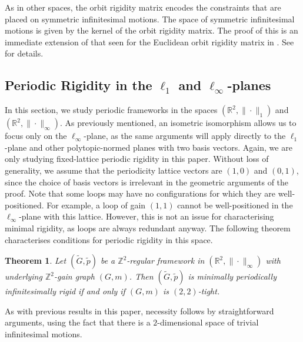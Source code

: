 \documentclass[reqno,a4paper,10pt]{article}
\newtheorem{theorem}{Theorem}[section]
\theoremstyle{definition}
\theoremstyle{remark}
\numberwithin{equation}{section}
\numberwithin{figure}{section}
\numberwithin{table}{section}
\newcommand{\R}{\mathbb{R}}
\newcommand{\Z}{\mathbb{Z}}
\newcommand{\G}{\tilde{G}}
\newcommand{\p}{\tilde{p}}
\begin{document}
    As in other spaces, the orbit rigidity matrix encodes the constraints that are placed on symmetric infinitesimal motions. The space of symmetric infinitesimal motions is given by the kernel of the orbit rigidity matrix. The proof of this is an immediate extension of that seen for the Euclidean orbit rigidity matrix in \cite{Orbit}. See \cite{EssonThesis} for details.
    

    \subsection{Periodic Rigidity in the $\ell_1$ and $\ell_\infty$-planes}\label{SectionPolytopicPeriodic}
    In this section, we study periodic frameworks in the spaces $(\R^2,\|\cdot\|_1)$ and $(\R^2,\|\cdot\|_\infty)$. As previously mentioned, an isometric isomorphism allows us to focus only on the $\ell_\infty$-plane, as the same arguments will apply directly to the $\ell_1$-plane and other polytopic-normed planes with two basis vectors. Again, we are only studying fixed-lattice periodic rigidity in this paper. Without loss of generality, we assume that the periodicity lattice vectors are $(1,0)$ and $(0,1)$, since the choice of basis vectors is irrelevant in the geometric arguments of the proof. Note that some loops may have no configurations for which they are well-positioned. For example, a loop of gain $(1,1)$ cannot be well-positioned in the $\ell_\infty$-plane with this lattice. However, this is not an issue for characterising minimal rigidity, as loops are always redundant anyway. The following theorem characterises conditions for periodic rigidity in this space.
    
    \begin{theorem}\label{PolyPeriodic}
        Let $(\G,\p)$ be a $\Z^2$-regular framework in $(\R^2,\|\cdot\|_{\infty})$ with underlying $\Z^2$-gain graph $(G,m)$. Then $(\G,\p)$ is minimally periodically infinitesimally rigid if and only if $(G,m)$ is $(2,2)$-tight.
    \end{theorem}
    As with previous results in this paper, necessity follows by straightforward arguments, using the fact  that there is a $2$-dimensional space of trivial  infinitesimal motions.
    
\end{document}
